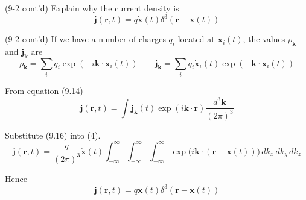 \documentclass[12pt]{article}
\begin{document}
\bigskip
(9-2 cont'd)
Explain why the current density is
\begin{equation*}
\mathbf j(\mathbf r,t)=q\dot{\mathbf x}(t)\delta^3(\mathbf r-\mathbf x(t))
\end{equation*}

(9-2 cont'd)
If we have a number of charges $q_i$ located at $\mathbf x_i(t)$,
the values $\rho_{\mathbf k}$ and $\mathbf j_{\mathbf k}$ are
\begin{equation*}
\rho_{\mathbf k}=\sum_iq_i\exp(-i\mathbf k\cdot\mathbf x_i(t))
\qquad
\mathbf j_{\mathbf k}
=\sum_iq_i\dot{\mathbf x}_i(t)
\exp(-\mathbf k\cdot\mathbf x_i(t))
\tag{9.16}
\end{equation*}

From equation (9.14)
\begin{equation*}
\mathbf j(\mathbf r,t)
=\int\mathbf j_{\mathbf k}(t)
\exp(i\mathbf k\cdot\mathbf r)
\frac{d^3\mathbf k}{(2\pi)^3}
\tag{4}
\end{equation*}

Substitute (9.16) into (4).
\begin{equation*}
\mathbf j(\mathbf r,t)
=\frac{q}{(2\pi)^3}\dot{\mathbf x}(t)
\int_{-\infty}^\infty
\int_{-\infty}^\infty
\int_{-\infty}^\infty
\exp\big(i\mathbf k\cdot(\mathbf r-\mathbf x(t))\big)
\,dk_x\,dk_y\,dk_z
\end{equation*}

Hence
\begin{equation*}
\mathbf j(\mathbf r,t)=q\dot{\mathbf x}(t)\delta^3(\mathbf r-\mathbf x(t))
\end{equation*}
\end{document}
